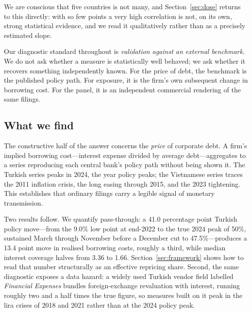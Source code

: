 \documentclass[review,12pt,authoryear]{elsarticle}
\theoremstyle{plain}
\theoremstyle{definition}
\begin{document}
We are conscious that five countries is not many, and Section~\ref{sec:dose}
returns to this directly: with so few points a very high correlation is not, on
its own, strong statistical evidence, and we read it qualitatively rather than
as a precisely estimated slope.

Our diagnostic standard throughout is \emph{validation against an external
benchmark}. We do not ask whether a measure is statistically well behaved; we
ask whether it recovers something independently known. For the price of debt,
the benchmark is the published policy path. For exposure, it is the firm's own
subsequent change in borrowing cost. For the panel, it is an independent
commercial rendering of the same filings.

\subsection{What we find}

The constructive half of the answer concerns the \emph{price} of corporate debt.
A firm's implied borrowing cost---interest expense divided by average
debt---aggregates to a series reproducing each central bank's policy path
without being shown it. The Turkish series peaks in 2024, the year policy peaks;
the Vietnamese series traces the 2011 inflation crisis, the long easing through
2015, and the 2023 tightening. This establishes that ordinary filings carry a
legible signal of monetary transmission.

Two results follow. We quantify pass-through: a 41.0 percentage point Turkish
policy move---from the 9.0\% low point at end-2022 to the true 2024 peak of
50\%, sustained March through November before a December cut to
47.5\%---produces a 13.4 point move in realised borrowing costs, roughly a
third, while median interest coverage halves from 3.36 to 1.66.
Section~\ref{sec:framework} shows how to read that number structurally as an
effective repricing share. Second, the same diagnostic exposes a data hazard: a
widely used Turkish vendor field labelled \emph{Financial Expenses} bundles
foreign-exchange revaluation with interest, running roughly two and a half
times the true figure, so measures built on it peak in the lira crises of
2018 and 2021 rather than at the 2024 policy peak.
\end{document}
